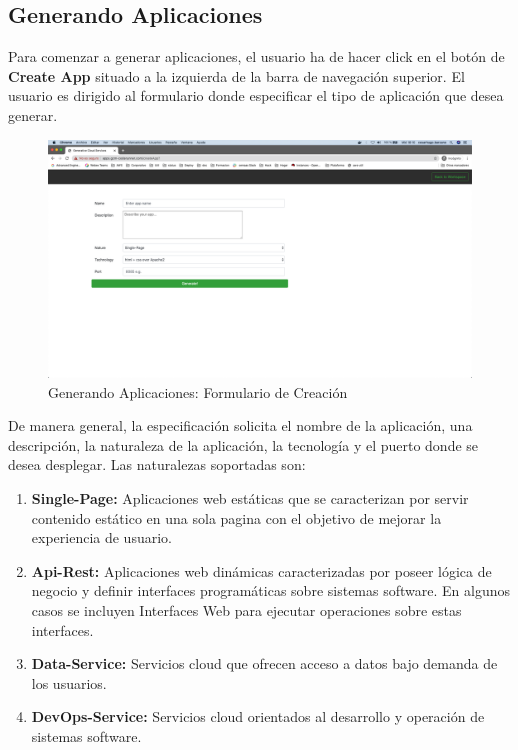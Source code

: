 \documentclass[a4paper,11pt]{book}
\begin{document}
\subsection{Generando Aplicaciones}

Para comenzar a generar aplicaciones, el usuario ha de hacer click en el botón de \textbf{Create App} situado a la izquierda de la barra de navegación superior. El usuario es dirigido al formulario donde especificar el tipo de aplicación que desea generar. 

\begin{figure}[H]
\centering
\includegraphics[scale=0.2]{imagenes/casouso/5.png}
\caption{ Generando Aplicaciones: Formulario de Creación  }
\end{figure}

De manera general, la especificación solicita el nombre de la aplicación, una descripción, la naturaleza de la aplicación, la tecnología y el puerto donde se desea desplegar. Las naturalezas soportadas son:

\begin{enumerate}
\item \textbf{ Single-Page: } Aplicaciones web estáticas que se caracterizan por servir contenido estático en una sola pagina con el objetivo de mejorar la experiencia de usuario. 
\item \textbf{ Api-Rest: } Aplicaciones web dinámicas caracterizadas por poseer lógica de negocio y definir interfaces programáticas sobre sistemas software. En algunos casos se incluyen Interfaces Web para ejecutar operaciones sobre estas interfaces.  
\item \textbf{ Data-Service:} Servicios cloud que ofrecen acceso a datos bajo demanda de los usuarios. 
\item \textbf{ DevOps-Service: } Servicios cloud orientados al desarrollo y operación de sistemas software. 
\end{enumerate}
\end{document}
